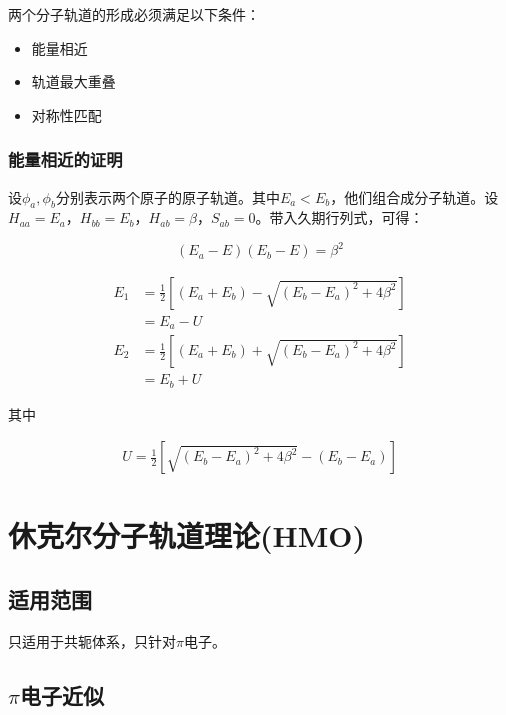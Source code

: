 两个分子轨道的形成必须满足以下条件：

\begin{itemize}
    \item 能量相近
    \item 轨道最大重叠
    \item 对称性匹配
\end{itemize}


\subsubsection{能量相近的证明}

设$\phi_a, \phi_b$分别表示两个原子的原子轨道。其中$E_a < E_b$，他们组合成分子轨道。设$H_{aa} = E_a$，$H_{bb} = E_b$，$H_{ab} = \beta$，$S_{ab} = 0$。带入久期行列式，可得：

\begin{equation*}
    (E_a - E)(E_b - E) = \beta^2
\end{equation*}

\begin{align*}
    E_1 &= \frac{1}{2} \left[ (E_a + E_b) - \sqrt{\left(  E_b - E_a \right)^2 + 4\beta^2}  \right] \\ 
    &= E_a - U
\end{align*}
\begin{align*}
    E_2 &= \frac{1}{2} \left[ (E_a + E_b) + \sqrt{\left(  E_b - E_a \right)^2 + 4\beta^2}  \right] \\ 
    &= E_b + U
\end{align*}

其中

\begin{align*}
    U = \frac{1}{2} \left[ \sqrt{ \left(E_b - E_a\right)^2 + 4\beta^2} - \left(E_b - E_a\right) \right]
\end{align*}

\section{休克尔分子轨道理论(HMO)}

\subsection{适用范围}

只适用于共轭体系，只针对$\pi$电子。

\subsection{$\pi$电子近似}

